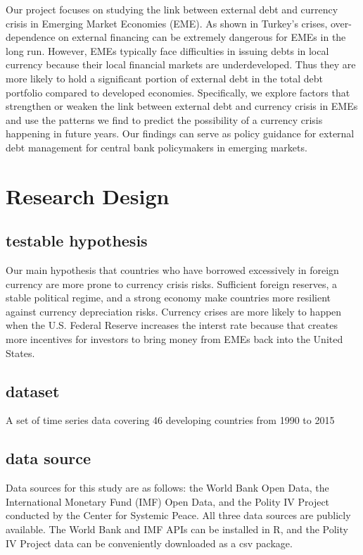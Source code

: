 \documentclass[12pt,]{article}
\begin{document}
Our project focuses on studying the link between external debt and
currency crisis in Emerging Market Economies (EME). As shown in Turkey's
crises, over-dependence on external financing can be extremely dangerous
for EMEs in the long run. However, EMEs typically face difficulties in
issuing debts in local currency because their local financial markets
are underdeveloped. Thus they are more likely to hold a significant
portion of external debt in the total debt portfolio compared to
developed economies. Specifically, we explore factors that strengthen or
weaken the link between external debt and currency crisis in EMEs and
use the patterns we find to predict the possibility of a currency crisis
happening in future years. Our findings can serve as policy guidance for
external debt management for central bank policymakers in emerging
markets.

\section{Research Design}\label{research-design}

\subsection{testable hypothesis}\label{testable-hypothesis}

Our main hypothesis that countries who have borrowed excessively in
foreign currency are more prone to currency crisis risks. Sufficient
foreign reserves, a stable political regime, and a strong economy make
countries more resilient against currency depreciation risks. Currency
crises are more likely to happen when the U.S. Federal Reserve increases
the interst rate because that creates more incentives for investors to
bring money from EMEs back into the United States.

\subsection{dataset}\label{dataset}

A set of time series data covering 46 developing countries from 1990 to
2015

\subsection{data source}\label{data-source}

Data sources for this study are as follows: the World Bank Open Data,
the International Monetary Fund (IMF) Open Data, and the Polity IV
Project conducted by the Center for Systemic Peace. All three data
sources are publicly available. The World Bank and IMF APIs can be
installed in R, and the Polity IV Project data can be conveniently
downloaded as a csv package.
\end{document}

